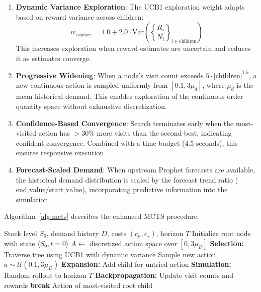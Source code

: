 \documentclass[conference]{IEEEtran}
\begin{document}
\begin{enumerate}
    \item \textbf{Dynamic Variance Exploration}: The UCB1 exploration weight adapts based on reward variance across children:
    \begin{equation}
    w_{explore} = 1.0 + 2.0 \cdot \text{Var}\left(\left\{\frac{R_i}{N_i}\right\}_{i \in \text{children}}\right)
    \label{eq:ucb1_variant}
    \end{equation}
    This increases exploration when reward estimates are uncertain and reduces it as estimates converge.
    
    \item \textbf{Progressive Widening}: When a node's visit count exceeds $5 \cdot |\text{children}|^{1.5}$, a new continuous action is sampled uniformly from $[0.1, 3\mu_d]$, where $\mu_d$ is the mean historical demand. This enables exploration of the continuous order quantity space without exhaustive discretization.
    
    \item \textbf{Confidence-Based Convergence}: Search terminates early when the most-visited action has $>30\%$ more visits than the second-best, indicating confident convergence. Combined with a time budget (4.5 seconds), this ensures responsive execution.
    
    \item \textbf{Forecast-Scaled Demand}: When upstream Prophet forecasts are available, the historical demand distribution is scaled by the forecast trend ratio ($\text{end\_value} / \text{start\_value}$), incorporating predictive information into the simulation.
\end{enumerate}

Algorithm~\ref{alg:mcts} describes the enhanced MCTS procedure.

\begin{algorithm}[htbp]
\caption{Enhanced MCTS for Inventory Optimization}
\label{alg:mcts}
\begin{algorithmic}[1]
\REQUIRE Stock level $S_0$, demand history $D$, costs $(c_h, c_s)$, horizon $T$
\STATE Initialize root node with state $\langle S_0, t{=}0 \rangle$
\STATE $A \leftarrow$ discretized action space over $[0, 3\mu_D]$
    \STATE \textbf{Selection:} Traverse tree using UCB1 with dynamic variance
        \STATE Sample new action $a \sim \mathcal{U}(0.1, 3\mu_D)$
    \ENDIF
    \STATE \textbf{Expansion:} Add child for untried action
    \STATE \textbf{Simulation:} Random rollout to horizon $T$
    \STATE \textbf{Backpropagation:} Update visit counts and rewards
        \STATE \textbf{break} 
    \ENDIF
\ENDWHILE
\RETURN Action of most-visited root child
\end{algorithmic}
\end{algorithm}
\end{document}

